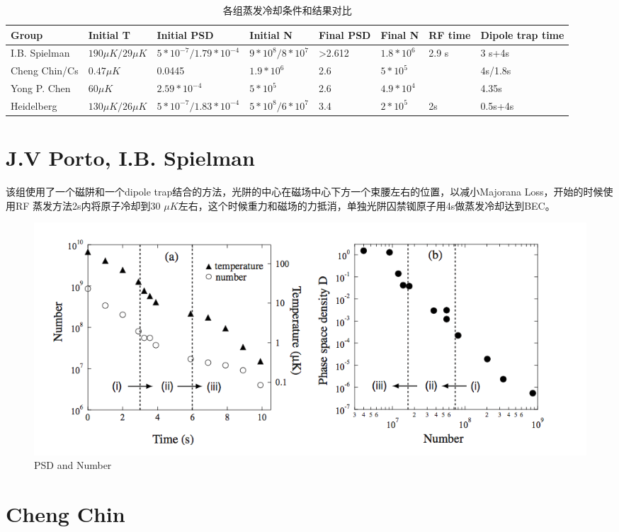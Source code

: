 \documentclass[onecolumn,a4paper,10pt]{article}
\begin{document}
\begin{table}[H]
\small
\centering
\caption{各组蒸发冷却条件和结果对比}
\label{tab:chap04-01}
\begin{tabular}{l|l|l|l|l|l|l|l}
\hline
Group & Initial T & Initial PSD& Initial N & Final PSD & Final N & RF time & Dipole trap time  \\
\hline
I.B. Spielman & $190\mu K/29\mu K$ &$5*10^{-7} /1.79*10^{-4}$& $9*10^8/8*10^7$& >2.612&$1.8*10^6$&2.9 s&3 s+4s\\
\hline
Cheng Chin/Cs&$0.47 \mu K$&0.0445&$1.9*10^6$&2.6&$5*10^5$&&4s/1.8s\\
\hline
Yong P. Chen&$60\mu K$&$2.59*10^{-4}$&$5*10^5$&2.6&$4.9*10^4$&&4.35s\\
\hline
Heidelberg&$130 \mu K/26\mu K$&$5*10^{-7}/1.83*10^{-4}$&$5*10^8/6*10^7$&3.4&$2*10^5$&2s&0.5s+4s\\
\hline
\end{tabular}
\end{table}

\section{J.V Porto, I.B. Spielman\cite{mc1}}

该组使用了一个磁阱和一个dipole trap结合的方法，光阱的中心在磁场中心下方一个束腰左右的位置，以减小Majorana Loss，开始的时候使用RF 蒸发方法2s内将原子冷却到30 $\mu K$左右，这个时候重力和磁场的力抵消，单独光阱囚禁铷原子用4s做蒸发冷却达到BEC。
\begin{figure}[htbp]
\centering
\includegraphics[width=1\textwidth]{Spielman}
\caption{PSD and Number}
\label{fig1:Spielman}
\end{figure}


\section{Cheng Chin\cite{mc2}}
\end{document}
